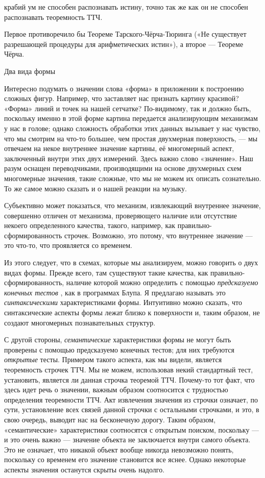 \documentclass[../main.tex]{subfiles}
\begin{document}
крабий ум не способен распознавать истину, точно так же как он не способен распознавать теоремность ТТЧ.

Первое противоречило бы Теореме Тарского-Чёрча-Тюринга («Не существует разрешающей процедуры для арифметических истин»), а второе --- Теореме Чёрча.

Два вида формы

Интересно подумать о значении слова «форма» в приложении к построению сложных фигур. Например, что заставляет нас признать картину красивой? «Форма» линий и точек на нашей сетчатке? По-видимому, так и должно быть, поскольку именно в этой форме картина передается анализирующим механизмам у нас в голове; однако сложность обработки этих данных вызывает у нас чувство, что мы смотрим на что-то большее, чем простая двухмерная поверхность, --- мы отвечаем на некое внутреннее значение картины, её многомерный аспект, заключенный внутри этих двух измерений. Здесь важно слово «значение». Наш разум оснащен переводчиками, производящими на основе двухмерных схем многомерные значения, такие сложные, что мы не можем их описать сознательно. То же самое можно сказать и о нашей реакции на музыку.

Субъективно может показаться, что механизм, извлекающий внутреннее значение, совершенно отличен от механизма, проверяющего наличие или отсутствие некоего определенного качества, такого, например, как правильно-сформированность строчек. Возможно, это потому, что внутреннее значение --- это что-то, что проявляется со временем.

Из этого следует, что в схемах, которые мы анализируем, можно говорить о двух видах формы. Прежде всего, там существуют такие качества, как правильно-сформированность, наличие которой можно определить с помощью \emph{предсказуемо конечных тестов} , как в программах Блупа. Я предлагаю называть это \emph{синтаксическими} характеристиками формы. Интуитивно можно сказать, что синтаксические аспекты формы лежат близко к поверхности и, таким образом, не создают многомерных познавательных структур.

С другой стороны, \emph{семантические} характеристики формы не могут быть проверены с помощью предсказуемо конечных тестов; для них требуются \emph{открытые} тесты. Примером такого аспекта, как мы видели, является теоремность строчек ТТЧ. Мы не можем, использовав некий стандартный тест, установить, является ли данная строчка теоремой ТТЧ. Почему-то тот факт, что здесь идет речь о значении, важным образом соотносится с трудностью определения теоремности ТТЧ. Акт извлечения значения из строчки означает, по сути, установление всех связей данной строчки с остальными строчками, и это, в свою очередь, выводит нас на бесконечную дорогу. Таким образом, «семантические» характеристики соотносятся с открытым поиском, поскольку --- и это очень важно --- значение объекта не заключается внутри самого объекта. Это не означает, что никакой объект вообще никогда невозможно понять, поскольку со временем его значение становится все яснее. Однако некоторые аспекты значения останутся скрыты очень надолго.
\end{document}
